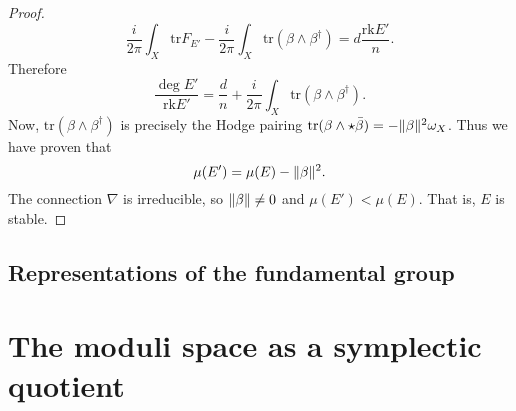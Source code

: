 \documentclass[12pt,a4paper]{book}
\theoremstyle{definition} \newtheorem{defn}[thm]{Definition}
\theoremstyle{definition} \newtheorem{ejemplo}[thm]{Example}
\theoremstyle{remark} \newtheorem*{rem}{Remark}
\def\tr{\mathrm{tr}}
\def\rk{\mathrm{rk}}
\DeclarePairedDelimiter\norm{\lVert}{\rVert}
\begin{document}
\begin{proof}
\begin{equation*}
  \frac{i}{2\pi}\int_X \tr F_{E'} - \frac{i}{2\pi} \int_X \tr(\beta \wedge \beta^\dagger) = d\frac{\rk E'}{n}.
\end{equation*}
Therefore
\begin{equation*}
  \frac{\deg E'}{ \rk E'} = \frac{d}{n} + \frac{i}{2\pi} \int_X \tr(\beta \wedge \beta^\dagger).
\end{equation*}
Now, $\tr(\beta\wedge \beta^\dagger)$ is precisely the Hodge pairing $\tr(\beta \wedge \star \bar{\beta}) = - \norm{\beta}^2 \omega_X$. Thus we have proven that 
\begin{equation*}
\mu(E')= \mu(E) - \norm{\beta}^2 .
\end{equation*}
The connection $\nabla$ is irreducible, so $\norm{\beta}\neq 0$ and $\mu(E')< \mu(E)$. That is, $E$ is stable.
\end{proof}

\section{Representations of the fundamental group}

\chapter{The moduli space as a symplectic quotient}
\end{document}

